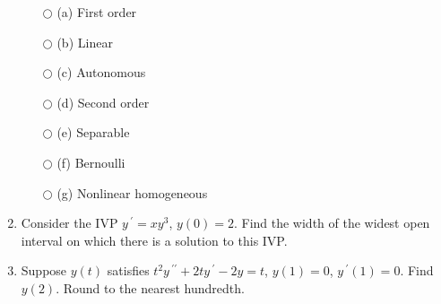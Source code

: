 \documentclass{ximera}
\begin{document}
\begin{enumerate}[label=(\arabic*)]
\begin{enumerate}[label=(\alph*)]
		\item[$\bigcirc$ (a)] First order\\ %
		\item[$\bigcirc$ (b)] Linear\\
		\item[$\bigcirc$ (c)] Autonomous\\  %
		\item[$\bigcirc$ (d)] Second order\\
		\item[$\bigcirc$ (e)] Separable\\  %
		\item[$\bigcirc$ (f)] Bernoulli\\
		\item[$\bigcirc$ (g)] Nonlinear homogeneous\\
	\end{enumerate} 




\item Consider the IVP $y\,^{\prime}=xy^3$, $y(0)=2$.  Find the width of the widest open interval on which there is a solution to this IVP.





\item Suppose $y(t)$ satisfies $t^2y\,^{\prime\prime}+2ty\,^{\prime}-2y=t$, $y(1)=0$, $y\,^{\prime}(1)=0$.  Find $y(2)$.  Round to the nearest hundredth.














\end{enumerate}
\end{document}
